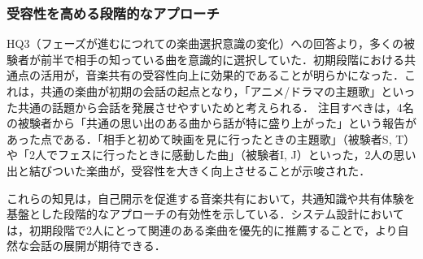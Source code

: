\subsubsection{受容性を高める段階的なアプローチ}
HQ3（フェーズが進むにつれての楽曲選択意識の変化）への回答より，多くの被験者が前半で相手の知っている曲を意識的に選択していた．初期段階における共通点の活用が，音楽共有の受容性向上に効果的であることが明らかになった．これは，共通の楽曲が初期の会話の起点となり，「アニメ/ドラマの主題歌」といった共通の話題から会話を発展させやすいためと考えられる．
注目すべきは，4名の被験者から「共通の思い出のある曲から話が特に盛り上がった」という報告があった点である．「相手と初めて映画を見に行ったときの主題歌」（被験者S, T）や「2人でフェスに行ったときに感動した曲」（被験者I, J）といった，2人の思い出と結びついた楽曲が，受容性を大きく向上させることが示唆された．

これらの知見は，自己開示を促進する音楽共有において，共通知識や共有体験を基盤とした段階的なアプローチの有効性を示している．システム設計においては，初期段階で2人にとって関連のある楽曲を優先的に推薦することで，より自然な会話の展開が期待できる．